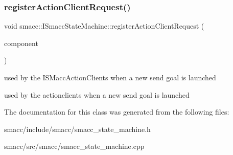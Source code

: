 \subsubsection{\texorpdfstring{register\+Action\+Client\+Request()}{registerActionClientRequest()}}
{\footnotesize\ttfamily void smacc\+::\+I\+Smacc\+State\+Machine\+::register\+Action\+Client\+Request (\begin{DoxyParamCaption}\item[{\hyperlink{classsmacc_1_1ISmaccActionClient}{I\+Smacc\+Action\+Client} $\ast$}]{component }\end{DoxyParamCaption})}



used by the I\+S\+Macc\+Action\+Clients when a new send goal is launched 

used by the actionclients when a new send goal is launched 

The documentation for this class was generated from the following files\+:\begin{DoxyCompactItemize}
\item 
smacc/include/smacc/smacc\+\_\+state\+\_\+machine.\+h\item 
smacc/src/smacc/smacc\+\_\+state\+\_\+machine.\+cpp\end{DoxyCompactItemize}
